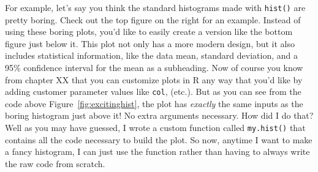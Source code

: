 \documentclass{tufte-book}\usepackage[]{graphicx}\usepackage[]{color}
\makeatletter
\def\maxwidth{ %
  \ifdim\Gin@nat@width>\linewidth
    \linewidth
  \else
    \Gin@nat@width
  \fi
}
\newcommand{\hlstr}[1]{\textcolor[rgb]{0.192,0.494,0.8}{#1}}%
\newcommand{\hlopt}[1]{\textcolor[rgb]{0,0,0}{#1}}%
\newcommand{\hlstd}[1]{\textcolor[rgb]{0.345,0.345,0.345}{#1}}%
\newcommand{\hlkwc}[1]{\textcolor[rgb]{0.333,0.667,0.333}{#1}}%
\newcommand{\hlkwd}[1]{\textcolor[rgb]{0.737,0.353,0.396}{\textbf{#1}}}%
\newenvironment{kframe}{%
 \def\at@end@of@kframe{}%
 \ifinner\ifhmode%
  \def\at@end@of@kframe{\end{minipage}}%
  \begin{minipage}{\columnwidth}%
 \fi\fi%
 \def\FrameCommand##1{\hskip\@totalleftmargin \hskip-\fboxsep
 \colorbox{shadecolor}{##1}\hskip-\fboxsep
     \hskip-\linewidth \hskip-\@totalleftmargin \hskip\columnwidth}%
 \MakeFramed {\advance\hsize-\width
   \@totalleftmargin\z@ \linewidth\hsize
   \@setminipage}}%
 {\par\unskip\endMakeFramed%
 \at@end@of@kframe}
\newenvironment{knitrout}{}{} %
\makeatother
\begin{document}

For example, let's say you think the standard histograms made with \texttt{hist()} are pretty boring. Check out the top figure on the right for an example. Instead of using these boring plots, you'd like to easily create a version like the bottom figure just below it. This plot not only has a more modern design, but it also includes statistical information, like the data mean, standard deviation, and a 95\% confidence interval for the mean as a subheading. Now of course you know from chapter XX that you can customize plots in R any way that you'd like by adding customer parameter values like \texttt{col},  (etc.). But as you can see from the code above Figure~\ref{fig:excitinghist}, the plot has \textit{exactly} the same inputs as the boring histogram just above it! No extra arguments necessary. How did I do that? Well as you may have guessed, I wrote a custom function called \texttt{my.hist()} that contains all the code necessary to build the plot. So now, anytime I want to make a fancy histogram, I can just use the  function rather than having to always write the raw code from scratch.
\end{document}
